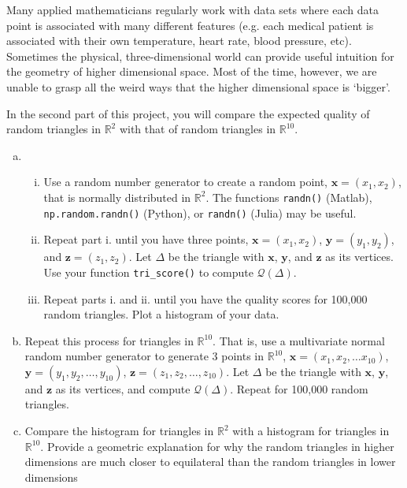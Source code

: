 \begin{center}
\end{center}

Many applied mathematicians regularly work with data sets where each data point is associated with many different features (e.g. each medical patient is associated with their own temperature, heart rate, blood pressure, etc). 
Sometimes the physical, three-dimensional world can provide useful intuition for the geometry of higher dimensional space. Most of the time, however, we are unable to grasp all the weird ways that the higher dimensional space is `bigger'. 

In the second part of this project, you will compare the expected quality of random triangles in $\mathbb{R}^2$ with that of random triangles in $\mathbb{R}^{10}$.
\begin{enumerate}[(a)]
  \item 
  \begin{enumerate}[i.]
    \item Use a random number generator to create a random point, \(\bm{x} = (x_1,x_2)\), that is normally distributed in $\mathbb{R}^2$. The functions \texttt{randn()} (Matlab), \texttt{np.random.randn()} (Python), or \texttt{randn()} (Julia) may be useful.
    \item Repeat part i. until you have three points, $\bm{x} = (x_1,x_2)$, \(\bm{y} = (y_1,y_2)\), and \(\bm{z} = (z_1,z_2)\). Let $\Delta$ be the triangle with $\bm{x}$, $\bm{y}$, and $\bm{z}$ as its vertices. Use your function \texttt{tri\_score()} to compute $\mathcal{Q}(\Delta)$.
    \item Repeat parts i. and ii. until you have the quality scores for 100,000 random triangles. Plot a histogram of your data.
  \end{enumerate}
  \item Repeat this process for triangles in $\mathbb{R}^{10}$. That is, use a multivariate normal random number generator to generate 3 points in $\mathbb{R}^{10}$, $\bm{x} = (x_1,x_2,\dots x_{10})$, $\bm{y} = (y_1,y_2,\dots,y_{10})$, $\bm{z} = (z_1,z_2, \dots, z_{10})$. Let $\Delta$ be the triangle with $\bm{x}$, $\bm{y}$, and $\bm{z}$ as its vertices, and compute $\mathcal{Q}(\Delta)$. Repeat for 100,000 random triangles.
 \item Compare the histogram for triangles in $\mathbb{R}^2$ with a histogram for triangles in $\mathbb{R}^{10}$.  Provide a geometric explanation for why the random triangles in higher dimensions are much closer to equilateral than the random triangles in lower dimensions
\end{enumerate}
